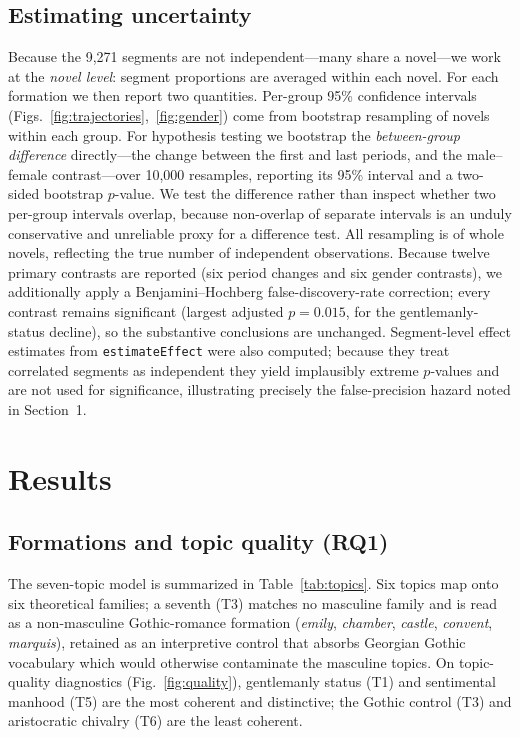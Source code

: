 \documentclass[11pt]{article}
\begin{document}
\subsection{Estimating uncertainty}
\label{sec:inference}
Because the 9{,}271 segments are not independent---many share a novel---we work
at the \emph{novel level}: segment proportions are averaged within each novel.
For each formation we then report two quantities. Per-group 95\% confidence
intervals (Figs.~\ref{fig:trajectories},~\ref{fig:gender}) come from bootstrap
resampling of novels within each group. For hypothesis testing we bootstrap the
\emph{between-group difference} directly---the change between the first and last
periods, and the male--female contrast---over 10{,}000 resamples, reporting its
95\% interval and a two-sided bootstrap $p$-value. We test the difference rather
than inspect whether two per-group intervals overlap, because non-overlap of
separate intervals is an unduly conservative and unreliable proxy for a
difference test. All resampling is of whole novels, reflecting the true number
of independent observations. Because twelve primary contrasts are reported (six
period changes and six gender contrasts), we additionally apply a
Benjamini--Hochberg false-discovery-rate correction; every contrast remains
significant (largest adjusted $p=0.015$, for the gentlemanly-status decline), so
the substantive conclusions are unchanged. Segment-level effect estimates from
\texttt{estimateEffect} were also computed; because they treat correlated
segments as independent they yield implausibly extreme $p$-values and are not
used for significance, illustrating precisely the false-precision hazard noted
in Section~1.

\section{Results}

\subsection{Formations and topic quality (RQ1)}
The seven-topic model is summarized in Table~\ref{tab:topics}. Six topics map onto
six theoretical families; a seventh (T3) matches no masculine family and is read
as a non-masculine Gothic-romance formation (\emph{emily}, \emph{chamber},
\emph{castle}, \emph{convent}, \emph{marquis}), retained as an interpretive
control that absorbs Georgian Gothic vocabulary which would otherwise contaminate
the masculine topics. On topic-quality diagnostics
(Fig.~\ref{fig:quality}), gentlemanly status (T1) and sentimental manhood (T5)
are the most coherent and distinctive; the Gothic control (T3) and aristocratic
chivalry (T6) are the least coherent.
\end{document}
